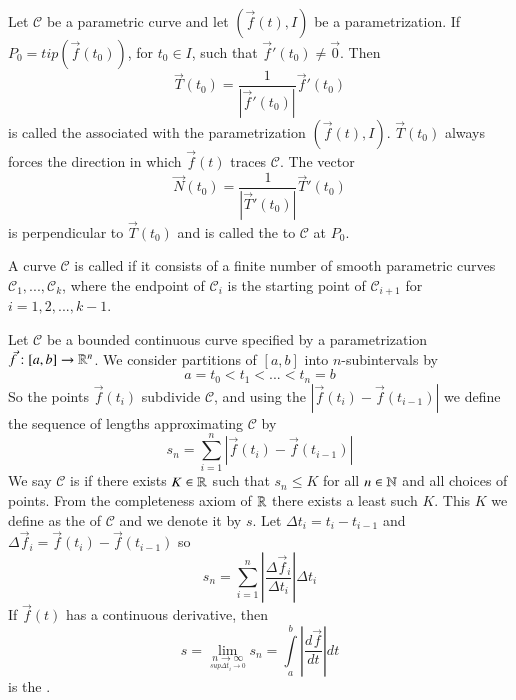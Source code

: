 \documentclass[12pt, a4paper, oneside, openright, titlepage]{book}
\begin{document}
\begin{appendices}
    \begin{defn}
        Let $\mathscr{C}$ be a parametric curve and let $(\vec{f}(t), I)$ be a parametrization. If $P_0 = tip(\vec{f}(t_0))$, for $t_0 \in I$, such that $\vec{f}'(t_0) \neq \vec{0}$. Then \begin{equation}
            \vec{T}(t_0) = \frac{1}{|\vec{f}'(t_0)|}\vec{f}'(t_0)
        \end{equation}
        is called the  associated with the parametrization $(\vec{f}(t), I)$. $\vec{T}(t_0)$ always forces the direction in which $\vec{f}(t)$ traces $\mathscr{C}$. The vector \begin{equation}
            \vec{N}(t_0) = \frac{1}{|\vec{T}'(t_0)|}\vec{T}'(t_0)
        \end{equation}
        is perpendicular to $\vec{T}(t_0)$ and is called the  to $\mathscr{C}$ at $P_0$.
    \end{defn}


    
    \begin{defn}
        A curve $\mathscr{C}$ is called  if it consists of a finite number of smooth parametric curves $\mathscr{C}_1,...,\mathscr{C}_k$, where the endpoint of $\mathscr{C}_i$ is the starting point of $\mathscr{C}_{i+1}$ for $i = 1,2,...,k-1$.
    \end{defn}


    \begin{defn}
        Let $\mathscr{C}$ be a bounded continuous curve specified by a parametrization $\vec{f}:[a,b]\rightarrow \mathbb R^n$. We consider partitions of $[a,b]$ into $n$-subintervals by \begin{equation}
            a= t_0 < t_1 < ... < t_n = b
        \end{equation}
        So the points $\vec{f}(t_i)$ subdivide $\mathscr{C}$, and using the  $|\vec{f}(t_i) - \vec{f}(t_{i-1})|$ we define the sequence of lengths approximating $\mathscr{C}$ by \begin{equation}
            s_n = \sum\limits_{i=1}^n|\vec{f}(t_i) - \vec{f}(t_{i-1})|
        \end{equation}
        We say $\mathscr{C}$ is  if there exists $K \in \mathbb R$ such that $s_n \leq K$ for all $n \in \mathbb N$ and all choices of points. From the completeness axiom of $\mathbb R$ there exists a least such $K$. This $K$ we define as the  of $\mathscr{C}$ and we denote it by $s$. Let $\Delta t_i = t_i - t_{i-1}$ and $\Delta \vec{f}_i = \vec{f}(t_i) - \vec{f}(t_{i-1})$ so \begin{equation}
            s_n = \sum\limits_{i=1}^n\left|\frac{\Delta \vec{f}_i}{\Delta t_i}\right|\Delta t_i
        \end{equation}
        If $\vec{f}(t)$ has a continuous derivative, then \begin{equation}
            s = \lim\limits_{\underset{sup\Delta t_i\rightarrow 0}{n\rightarrow \infty}} s_n = \int\limits_a^b\left|\frac{d\vec{f}}{dt}\right|dt
        \end{equation}
        is the .
    \end{defn}



\end{appendices}
\end{document}

